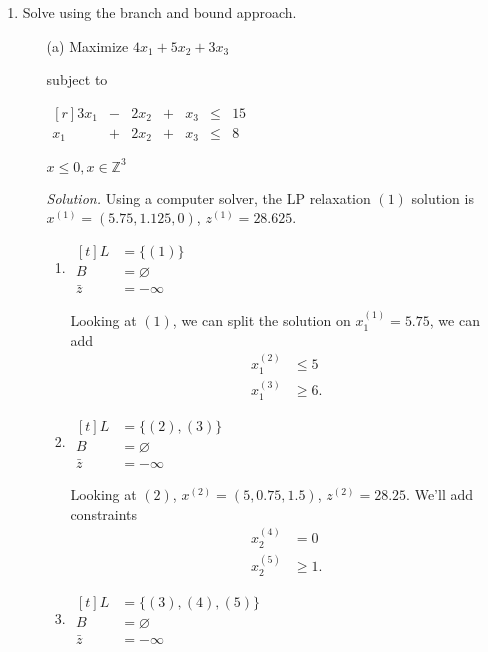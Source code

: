 \documentclass{homework}
\newcommand{\solution}{	\vspace{1em} \textit{Solution.} \quad }
\newcommand{\bolditem}[1][YYY]{\item[\textbf{#1}]}
\begin{document}
\begin{enumerate}
		\bolditem[6.4.2] Solve using the branch and bound approach. \begin{enumerate}
			\item[(a)] 
				Maximize $4x_1 + 5x_2 + 3x_3$ 
				
				subject to
				
				$\begin{matrix*}[r]
					3x_1 & - & 2x_2 & + & x_3 & \le & 15 \\
					x_1 & + & 2x_2 & + & x_3 & \le & 8
				\end{matrix*}$
			
				$x \le 0, x \in \mathbb{Z}^3$
				
				\solution  Using a computer solver, the LP relaxation $(1)$ solution is $x^{(1)}=(5.75, 1.125, 0)$, $z^{(1)}=28.625$.
				\begin{enumerate}
					\item $\begin{aligned}[t]
						L & = \{(1)\} \\
						B & = \varnothing \\
						\bar{z} & = -\infty
					\end{aligned}$
					
					Looking at $(1)$, we can split the solution on $x^{(1)}_1 = 5.75$, we can add \begin{align}
						x_1^{(2)} & \le 5 \tag{2} \\
						x_1^{(3)} & \ge 6 \tag{3}.
					\end{align}
				
					\item  $\begin{aligned}[t]
						L & = \{(2), (3)\} \\
						B & = \varnothing \\
						\bar{z} & = -\infty
					\end{aligned}$
				
					Looking at $(2)$, $x^{(2)} = (5, 0.75, 1.5)$, $z^{(2)} = 28.25$. We'll add constraints \begin{align}
						x_2^{(4)} & = 0 \tag{4} \\
						x_2^{(5)} & \ge 1 \tag{5}.
					\end{align}
				
					\item $\begin{aligned}[t]
						L & = \{(3), (4), (5)\} \\
						B & = \varnothing \\
						\bar{z} & = -\infty
					\end{aligned}$
				

\end{enumerate}
\end{enumerate}
\end{enumerate}
\end{document}
